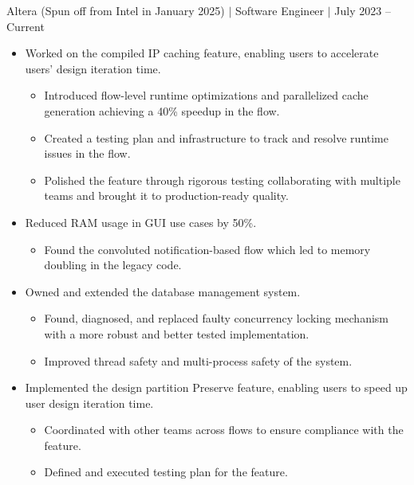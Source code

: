 \documentclass[12pt]{article}
\newcommand{\textDate}[3]{\noindent#1 $|$ #2 $|$ {\color{textGray} #3}}
\begin{document}
    \textDate{Altera (Spun off from Intel in January 2025)}{Software Engineer}{July 2023 -- Current}
    \begin{small}
        \begin{itemize}
            \itemsep0em 

            \item {Worked on the compiled IP caching feature, enabling users to accelerate users' design iteration time.}
                \begin{itemize}[label=$\circ$,topsep=-5px,partopsep=0px]
                    \itemsep0em 
                    \item {Introduced flow-level runtime optimizations and parallelized cache generation achieving a 40\% speedup in the flow.}
                    \item {Created a testing plan and infrastructure to track and resolve runtime issues in the flow.}
                    \item {Polished the feature through rigorous testing collaborating with multiple teams and brought it to production-ready quality.}
                \end{itemize}

            \item {Reduced RAM usage in GUI use cases by 50\%.}
                \begin{itemize}[label=$\circ$,topsep=-5px,partopsep=0px]
                    \itemsep0em 
                    \item {Found the convoluted notification-based flow which led to memory doubling in the legacy code.}
                \end{itemize}

            \item {Owned and extended the database management system.}
                \begin{itemize}[label=$\circ$,topsep=-5px,partopsep=0px]
                    \itemsep0em 
                    \item {Found, diagnosed, and replaced faulty concurrency locking mechanism with a more robust and better tested implementation.}
                    \item {Improved thread safety and multi-process safety of the system.}
                \end{itemize}

            \item {Implemented the design partition Preserve feature, enabling users to speed up user design iteration time.}
                \begin{itemize}[label=$\circ$,topsep=-5px,partopsep=0px]
                    \itemsep0em 
                    \item {Coordinated with other teams across flows to ensure compliance with the feature.}
                    \item {Defined and executed testing plan for the feature.}
                \end{itemize}



\end{itemize}
\end{small}
\end{document}
